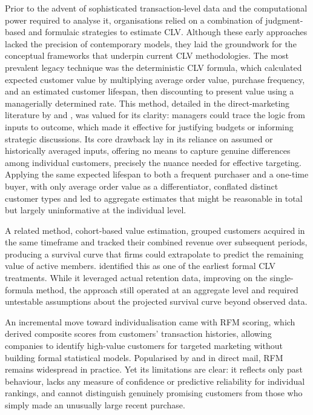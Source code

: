 \documentclass[12pt, a4paper, oneside]{report}
\begin{document}
Prior to the advent of sophisticated transaction-level data and the computational power required to analyse it, organisations relied on a combination of judgment-based and formulaic strategies to estimate CLV. Although these early approaches lacked the precision of contemporary models, they laid the groundwork for the conceptual frameworks that underpin current CLV methodologies. The most prevalent legacy technique was the deterministic CLV formula, which calculated expected customer value by multiplying average order value, purchase frequency, and an estimated customer lifespan, then discounting to present value using a managerially determined rate. This method, detailed in the direct-marketing literature by \textcite{hughes1994} and \textcite{stone1995}, was valued for its clarity: managers could trace the logic from inputs to outcome, which made it effective for justifying budgets or informing strategic discussions. Its core drawback lay in its reliance on assumed or historically averaged inputs, offering no means to capture genuine differences among individual customers, precisely the nuance needed for effective targeting. Applying the same expected lifespan to both a frequent purchaser and a one-time buyer, with only average order value as a differentiator, conflated distinct customer types and led to aggregate estimates that might be reasonable in total but largely uninformative at the individual level.

A related method, cohort-based value estimation, grouped customers acquired in the same timeframe and tracked their combined revenue over subsequent periods, producing a survival curve that firms could extrapolate to predict the remaining value of active members. \textcite{dwyer1989} identified this as one of the earliest formal CLV treatments. While it leveraged actual retention data, improving on the single-formula method, the approach still operated at an aggregate level and required untestable assumptions about the projected survival curve beyond observed data.

An incremental move toward individualisation came with RFM scoring, which derived composite scores from customers' transaction histories, allowing companies to identify high-value customers for targeted marketing without building formal statistical models. Popularised by \textcite{hughes1994} and \textcite{cullinan1977} in direct mail, RFM remains widespread in practice. Yet its limitations are clear: it reflects only past behaviour, lacks any measure of confidence or predictive reliability for individual rankings, and cannot distinguish genuinely promising customers from those who simply made an unusually large recent purchase.
\end{document}
